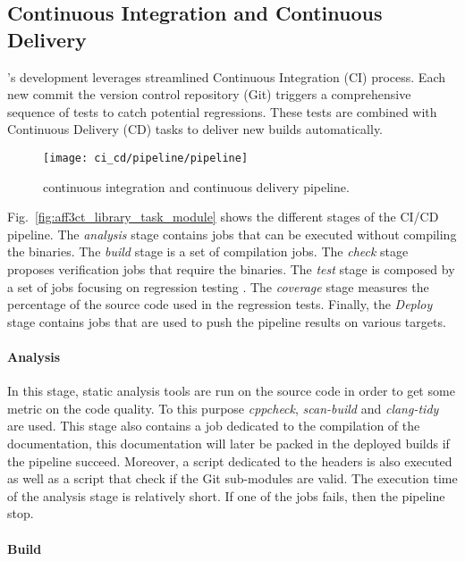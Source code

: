 \subsection{Continuous Integration and Continuous Delivery}
\label{sec:aff3ct_ci_cd}

\AFFECT's development leverages streamlined Continuous Integration (CI) process.
Each new commit the version control repository (Git) triggers a comprehensive
sequence of tests to catch potential regressions. These tests are combined with
Continuous Delivery (CD) tasks to deliver new \AFFECT builds automatically.

\begin{figure}[htp]
  \centering
  \texttt{[image: ci\_cd/pipeline/pipeline]}
  \caption{\AFFECT continuous integration and continuous delivery pipeline.}
  \label{fig:aff3ct_ci_cd_pipeline}
\end{figure}

Fig.~\ref{fig:aff3ct_library_task_module} shows the different stages of the
\AFFECT CI/CD pipeline. The \emph{analysis} stage contains jobs that can be
executed without compiling the \AFFECT binaries. The \emph{build} stage is a set
of compilation jobs. The \emph{check} stage proposes verification jobs that
require the \AFFECT binaries. The \emph{test} stage is composed by a set of jobs
focusing on regression testing . The \emph{coverage} stage measures the
percentage of the \AFFECT source code used in the regression tests. Finally, the
\emph{Deploy} stage contains jobs that are used to push the pipeline results on
various targets.

\paragraph{Analysis}

In this stage, static analysis tools are run on the \AFFECT source code
in order to get some metric on the code quality. To this purpose
\textit{cppcheck}, \textit{scan-build} and \textit{clang-tidy} are used. This
stage also contains a job dedicated to the compilation of the documentation,
this documentation will later be packed in the deployed builds if the pipeline
succeed. Moreover, a script dedicated to the \AFFECT headers is also executed as
well as a script that check if the Git sub-modules are valid. The execution time
of the analysis stage is relatively short. If one of the jobs fails, then the
pipeline stop.

\paragraph{Build}

